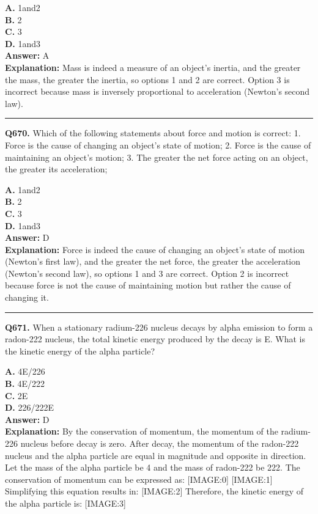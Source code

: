 \documentclass[12pt]{article}
\begin{document}
\textbf{A.} 1and2 \\
\textbf{B.} 2 \\
\textbf{C.} 3 \\
\textbf{D.} 1and3 \\

\textbf{Answer:} A \\
\textbf{Explanation:} Mass is indeed a measure of an object's inertia, and the greater the mass, the greater the inertia, so options 1 and 2 are correct. Option 3 is incorrect because mass is inversely proportional to acceleration (Newton's second law).

\hrule
\vspace{1em}


\noindent
\textbf{Q670.} Which of the following statements about force and motion is correct:
1.
Force is the cause of changing an object's state of motion;
2.
Force is the cause of maintaining an object's motion;
3.
The greater the net force acting on an object, the greater its acceleration;



\textbf{A.} 1and2 \\
\textbf{B.} 2 \\
\textbf{C.} 3 \\
\textbf{D.} 1and3 \\

\textbf{Answer:} D \\
\textbf{Explanation:} Force is indeed the cause of changing an object's state of motion (Newton's first law), and the greater the net force, the greater the acceleration (Newton's second law), so options 1 and 3 are correct. Option 2 is incorrect because force is not the cause of maintaining motion but rather the cause of changing it.

\hrule
\vspace{1em}


\noindent
\textbf{Q671.} When a stationary radium-226 nucleus decays by alpha emission to form a radon-222 nucleus, the total kinetic energy produced by the decay is E. What is the kinetic energy of the alpha particle?



\textbf{A.} 4E​/226 \\
\textbf{B.} 4E​/222 \\
\textbf{C.} 2E​ \\
\textbf{D.} 226/222E​ \\

\textbf{Answer:} D \\
\textbf{Explanation:} By the conservation of momentum, the momentum of the radium-226 nucleus before decay is zero. After decay, the momentum of the radon-222 nucleus and the alpha particle are equal in magnitude and opposite in direction. Let the mass of the alpha particle be 4 and the mass of radon-222 be 222. The conservation of momentum can be expressed as:
[IMAGE:0]
[IMAGE:1]
Simplifying this equation results in:
[IMAGE:2]
Therefore, the kinetic energy of the alpha particle is:
[IMAGE:3]
\end{document}
